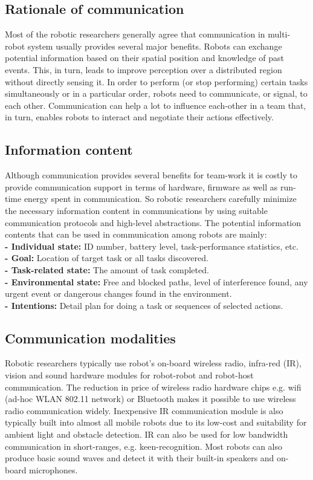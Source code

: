\documentclass{intech}
\begin{document}
\subsection{Rationale of communication}
Most of the robotic researchers generally agree that communication in multi-robot system usually provides several major benefits. Robots can exchange potential information based on their spatial position and knowledge of past events. This, in turn, leads to improve perception over a distributed region without directly sensing it. In order to perform (or stop performing) certain tasks simultaneously or in a particular order, robots need to communicate, or signal, to each other. Communication can help a lot to influence each-other in a team that, in turn, enables robots to interact and negotiate their actions effectively.
\subsection{Information content}
Although communication provides several benefits for team-work it is costly to provide communication support in terms of hardware, firmware as well as run-time energy spent in communication. So robotic researchers carefully minimize the necessary information content in communications by using suitable communication protocols and high-level abstractions.  The potential information contents that can be used in communication among robots are mainly:\\
\textbf{- Individual state:} ID number, battery level, task-performance statistics, etc.\\
\textbf{- Goal:} Location of target task or all tasks discovered.\\
\textbf{- Task-related state:} The amount of task completed.\\
\textbf{- Environmental state:} Free and blocked paths, level of interference found, any urgent event or dangerous changes found in the environment.\\
\textbf{- Intentions:} Detail plan for doing a task or sequences of selected actions.
\subsection{Communication modalities}
Robotic researchers typically use robot's on-board wireless radio, infra-red (IR), vision and sound hardware modules for robot-robot and robot-host communication. The reduction in price of wireless radio hardware chips e.g. wifi (ad-hoc WLAN 802.11 network) or Bluetooth makes it possible to use wireless radio communication widely. Inexpensive IR communication module is also typically built into almost all mobile robots due to its low-cost and suitability for ambient light and obstacle detection. IR can also be used for low bandwidth communication in short-ranges, e.g. keen-recognition. Most robots can also produce basic sound waves and detect it with their built-in speakers and on-board microphones. 
\end{document}

